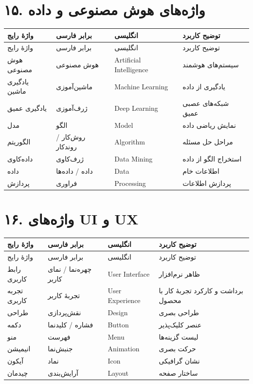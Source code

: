 \documentclass[a4paper,12pt,openany]{book}
\begin{document}
\section*{۱۵. واژه‌های هوش مصنوعی و داده}
\begingroup
\small
\setlength{\tabcolsep}{4pt}
\renewcommand{\arraystretch}{1.25}
\begin{longtable}{|p{2.5cm}|p{4.0cm}|p{2.3cm}|p{5.3cm}|}
\hline
واژهٔ رایج & برابر فارسی & انگلیسی & توضیح کاربرد \\
\hline
\endfirsthead
\hline
واژهٔ رایج & برابر فارسی & انگلیسی & توضیح کاربرد \\
\hline
\endhead
هوش مصنوعی & هوش مصنوعی & \textenglish{Artificial Intelligence} & سیستم‌های هوشمند \\
یادگیری ماشین & ماشین‌آموزی & \textenglish{Machine Learning} & یادگیری از داده \\
یادگیری عمیق & ژرف‌آموزی & \textenglish{Deep Learning} & شبکه‌های عصبی عمیق \\
مدل & الگو & \textenglish{Model} & نمایش ریاضی داده \\
الگوریتم & روش‌کار / روندکار & \textenglish{Algorithm} & مراحل حل مسئله \\
داده‌کاوی & ژرف‌کاوی & \textenglish{Data Mining} & استخراج الگو از داده \\
داده & داده / داده‌ها & \textenglish{Data} & اطلاعات خام \\
پردازش & فراوری & \textenglish{Processing} & پردازش اطلاعات \\
\hline
\end{longtable}
\endgroup

\section*{۱۶. واژه‌های UI و UX}
\begingroup
\small
\setlength{\tabcolsep}{4pt}
\renewcommand{\arraystretch}{1.25}
\begin{longtable}{|p{2.5cm}|p{4.0cm}|p{2.3cm}|p{5.3cm}|}
\hline
واژهٔ رایج & برابر فارسی & انگلیسی & توضیح کاربرد \\
\hline
\endfirsthead
\hline
واژهٔ رایج & برابر فارسی & انگلیسی & توضیح کاربرد \\
\hline
\endhead
رابط کاربری & چهره‌نما / نمای کاربر & \textenglish{User Interface} & ظاهر نرم‌افزار \\
تجربه کاربری & تجربهٔ کاربر & \textenglish{User Experience} & برداشت و کارکرد تجربهٔ کار با محصول \\
طراحی & نقش‌پردازی & \textenglish{Design} & طراحی بصری \\
دکمه & فشاره / کلیدنما & \textenglish{Button} & عنصر کلیک‌پذیر \\
منو & فهرست & \textenglish{Menu} & لیست گزینه‌ها \\
انیمیشن & جنبش‌نما & \textenglish{Animation} & حرکت بصری \\
آیکون & نماد & \textenglish{Icon} & نشان گرافیکی \\
چیدمان & آرایش‌بندی & \textenglish{Layout} & ساختار صفحه \\
\hline
\end{longtable}
\endgroup
\end{document}

